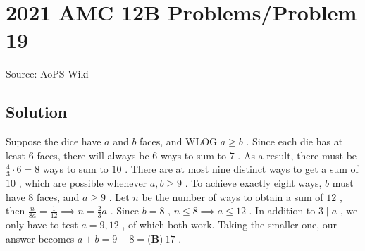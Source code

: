 \documentclass[12pt]{article}
\begin{document}
\section*{{2021 AMC 12B Problems/Problem 19}}
Source: AoPS Wiki

\subsection*{Solution}
Suppose the dice have $a$ and $b$ faces, and WLOG $a\geq{b}$ . Since each die has at least $6$ faces, there will always be $6$ ways to sum to $7$ . As a result, there must be $\tfrac{4}{3}\cdot6=8$ ways to sum to $10$ . There are at most nine distinct ways to get a sum of $10$ , which are possible whenever $a,b\geq{9}$ . To achieve exactly eight ways, $b$ must have $8$ faces, and $a\geq9$ . Let $n$ be the number of ways to obtain a sum of $12$ , then $\tfrac{n}{8a}=\tfrac{1}{12}\implies n=\tfrac{2}{3}a$ . Since $b=8$ , $n\leq8\implies a\leq{12}$ . In addition to $3\mid{a}$ , we only have to test $a=9,12$ , of which both work. Taking the smaller one, our answer becomes $a+b=9+8=\boxed{\textbf{(B)}\ 17}$ .
\end{document}
